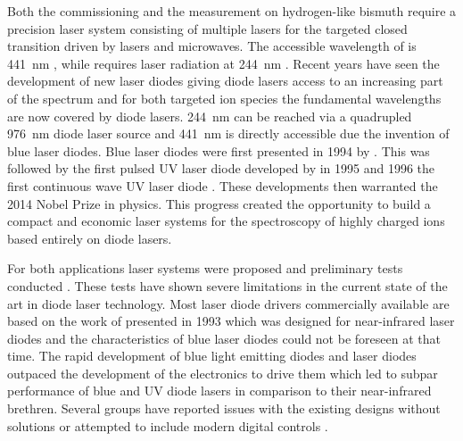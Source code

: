 Both the commissioning and the measurement on hydrogen-like bismuth require a precision laser system consisting of multiple lasers for the targeted closed transition driven by lasers and microwaves. The accessible wavelength of  is \qty{441}{\nm} \cite{ar13+_wavelength}, while  requires laser radiation at \qty{244}{\nm} \cite{bi82+_wavelength}. Recent years have seen the development of new laser diodes giving diode lasers access to an increasing part of the spectrum and for both targeted ion species the fundamental wavelengths are now covered by diode lasers. \qty{244}{\nm} can be reached via a quadrupled \qty{976}{\nm} diode laser source and \qty{441}{\nm} is directly accessible due the invention of blue laser diodes. Blue laser diodes were first presented in 1994 by \citeauthor{Nakamura_1996} \cite{Nakamura_1996}. This was followed by the first pulsed UV laser diode developed by \citeauthor{uv_pulsed_laser_diode_first} \cite{uv_pulsed_laser_diode_first} in 1995 and 1996 the first continuous wave UV laser diode \cite{uv_cw_laser_diode_first}. These developments then warranted the 2014 Nobel Prize in physics. This progress created the opportunity to build a compact and economic laser systems for the spectroscopy of highly charged ions based entirely on diode lasers.

For both applications laser systems were proposed and preliminary tests conducted \cite{thesis_baus,thesis_alex,thesis_tilman,thesis_seppo}. These tests have shown severe limitations in the current state of the art in diode laser technology. Most laser diode drivers commercially available are based on the work of \citeauthor{libbrecht_hall} presented in 1993 \cite{libbrecht_hall} which was designed for near-infrared laser diodes and the characteristics of blue laser diodes could not be foreseen at that time. The rapid development of blue light emitting diodes and laser diodes outpaced the development of the electronics to drive them which led to subpar performance of blue and UV diode lasers in comparison to their near-infrared brethren. Several groups have reported issues with the existing designs \cite{laser_driver_mosfet_noise} without solutions or attempted to include modern digital controls \cite{laser_driver_digital}.


